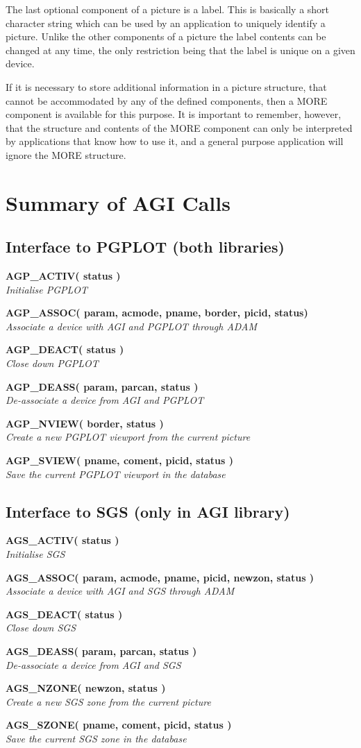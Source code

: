 \documentclass[twoside,11pt,nolof]{starlink}
\providecommand{\noteroutine}[2]{\textbf{#1}\hspace*{\fill}\nopagebreak \\
                             \hspace*{3em}\emph{#2}\hspace*{\fill}\par}
\begin{document}
The last optional component of a picture is a label. This is basically a
short character string which can be used by an application to uniquely
identify a picture. Unlike the other components of a picture the label
contents can be changed at any time, the only restriction being that
the label is unique on a given device.

If it is necessary to store additional information in a picture
structure, that cannot be accommodated by any of the defined components,
then a MORE component is available for this purpose. It is important to
remember, however, that the structure and contents of the MORE component
can only be interpreted by applications that know how to use it, and
a general purpose application will ignore the MORE structure.

\section {Summary of AGI Calls}

\subsection{Interface to PGPLOT (both libraries)}
\noteroutine{AGP\_ACTIV( status )}
        {Initialise PGPLOT}
\noteroutine{AGP\_ASSOC( param, acmode, pname, border, picid, status)}
        {Associate a device with AGI and PGPLOT through ADAM}
\noteroutine{AGP\_DEACT( status )}
        {Close down PGPLOT}
\noteroutine{AGP\_DEASS( param, parcan, status )}
        {De-associate a device from AGI and PGPLOT}
\noteroutine{AGP\_NVIEW( border, status )}
        {Create a new PGPLOT viewport from the current picture}
\noteroutine{AGP\_SVIEW( pname, coment, picid, status )}
        {Save the current PGPLOT viewport in the database}
\subsection{Interface to SGS (only in AGI library)}
\noteroutine{AGS\_ACTIV( status )}
        {Initialise SGS}
\noteroutine{AGS\_ASSOC( param, acmode, pname, picid, newzon, status )}
        {Associate a device with AGI and SGS through ADAM}
\noteroutine{AGS\_DEACT( status )}
        {Close down SGS}
\noteroutine{AGS\_DEASS( param, parcan, status )}
        {De-associate a device from AGI and SGS}
\noteroutine{AGS\_NZONE( newzon, status )}
        {Create a new SGS zone from the current picture}
\noteroutine{AGS\_SZONE( pname, coment, picid, status )}
        {Save the current SGS zone in the database}
\end{document}
